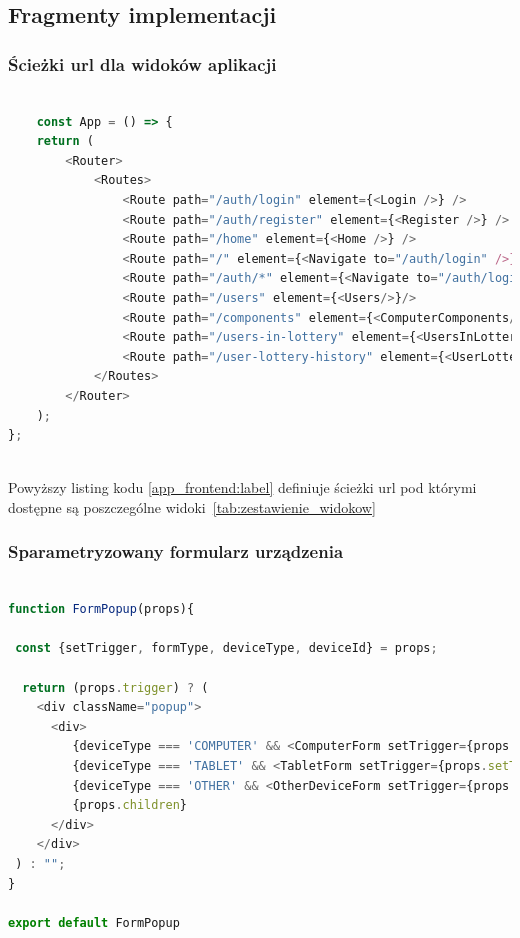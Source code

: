 \subsection{Fragmenty implementacji}
	\subsubsection{Ścieżki url dla widoków aplikacji}
	

\begin{lstlisting}[language=JavaScript, style=JavaScriptStyle,  caption={Zdefiniowane ścieżki url widoków systemu }, label={app_frontend:label}]
	
	const App = () => {
    return (
        <Router>
            <Routes>
                <Route path="/auth/login" element={<Login />} />
                <Route path="/auth/register" element={<Register />} />
                <Route path="/home" element={<Home />} />
                <Route path="/" element={<Navigate to="/auth/login" />} />
                <Route path="/auth/*" element={<Navigate to="/auth/login" />} />
                <Route path="/users" element={<Users/>}/>
                <Route path="/components" element={<ComputerComponents/>}/>
                <Route path="/users-in-lottery" element={<UsersInLottery/>}/>
                <Route path="/user-lottery-history" element={<UserLotteryHistory/>}/>
            </Routes>
        </Router>
    );
};
	
\end{lstlisting}
Powyższy listing kodu \ref{app_frontend:label} definiuje ścieżki url pod którymi dostępne są poszczególne widoki~\ref{tab:zestawienie_widokow}


\subsubsection{Sparametryzowany formularz urządzenia}

\begin{lstlisting}[language=JavaScript, style=JavaScriptStyle,  caption={Obsługa formularzy}, label={render_data:label}]

function FormPopup(props){
    
 const {setTrigger, formType, deviceType, deviceId} = props;
    
  return (props.trigger) ? (
    <div className="popup">
      <div>
         {deviceType === 'COMPUTER' && <ComputerForm setTrigger={props.setTrigger} formType={formType} deviceId={deviceId}/>}
         {deviceType === 'TABLET' && <TabletForm setTrigger={props.setTrigger} formType={formType} deviceId={deviceId}/>}
         {deviceType === 'OTHER' && <OtherDeviceForm setTrigger={props.setTrigger}  formType={formType} deviceId={deviceId} />}
         {props.children}
      </div>
    </div>
 ) : "";
}

export default FormPopup
										
\end{lstlisting}

